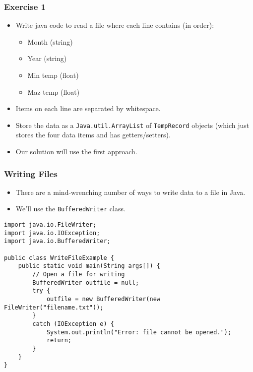 \documentclass[cmptslides]{cmpt280-slidesandsolutions}
\begin{document}
\begin{frame}
\frametitle{Exercise 1}
\begin{itemize}
	\item Write java code to read a file where each line contains (in order):
		\begin{itemize}[topsep=0pt]
		\item Month (string)
		\item Year (string)
		\item Min temp (float)
		\item Maz temp (float)
		\end{itemize}
	\item Items on each line are separated by whitespace.
	\item Store the data as a \lstinline{Java.util.ArrayList} of \lstinline{TempRecord} objects (which just stores the four data items and has getters/setters).
	\item Our solution will use the first approach.
\end{itemize}	
\end{frame}

\begin{frame}[fragile]
\frametitle{Writing Files}
\begin{itemize}
	\item There are a mind-wrenching number of ways to write data to a file in Java.
	\item We'll use the \lstinline{BufferedWriter} class.
\end{itemize}	
\begin{lstlisting}[basicstyle=\tt\tiny]
import java.io.FileWriter;
import java.io.IOException;
import java.io.BufferedWriter;

public class WriteFileExample {
    public static void main(String args[]) {
        // Open a file for writing
        BufferedWriter outfile = null;
        try {
            outfile = new BufferedWriter(new FileWriter("filename.txt"));
        }
        catch (IOException e) {
            System.out.println("Error: file cannot be opened.");
            return;
        }
    }	
}
\end{lstlisting}
\end{frame}
\end{document}

